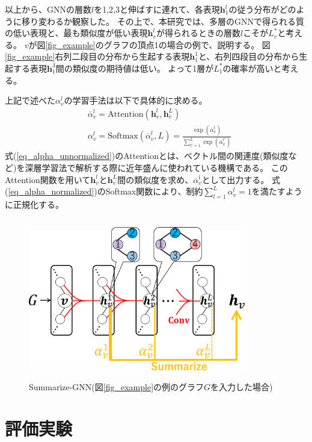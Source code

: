 \documentclass[a4j,twocolumn]{jsarticle}
\begin{document}
以上から、GNNの層数$l$を1,2,3と伸ばすに連れて、各表現$\bm{h}_1^l$の従う分布がどのように移り変わるか観察した。
その上で、本研究では、多層のGNNで得られる質の低い表現と、最も類似度が低い表現$\bm{h}_v^l$が得られるときの層数$l$こそが$L_v^*$と考える。
$v$が図\ref{fig_example}のグラフの頂点1の場合の例で、説明する。
図\ref{fig_example}右列二段目の分布から生起する表現$\bm{h}_1^1$と、右列四段目の分布から生起する表現$\bm{h}_1^3$間の類似度の期待値は低い。
よって1層が$L_1^*$の確率が高いと考える。


上記で述べた$\alpha_v^l$の学習手法は以下で具体的に求める。
\begin{align}
  & \overline{\alpha}_v^l = \text{Attention}(\bm{h}_v^l, \bm{h}_v^L) \label{eq_alpha_unnormalized} \\
  & \alpha_v^l = \text{Softmax}(\overline{\alpha}_v^l, L) = \frac{\exp(\overline{\alpha}_v^l)}{\sum_{l'=1}^L \exp(\overline{\alpha}_v^{l'})} \label{eq_alpha_normalized}
\end{align}
式(\ref{eq_alpha_unnormalized})のAttentionとは、ベクトル間の関連度(類似度など)を深層学習法で解析する際に近年盛んに使われている機構である。
このAttention関数を用いて$\bm{h}_v^l$と$\bm{h}_v^L$間の類似度を求め、$\overline{\alpha}_v^l$として出力する。
式(\ref{eq_alpha_normalized})のSoftmax関数により、制約$\sum_{l=1}^L \alpha_v^l=1$を満たすように正規化する。

\begin{figure}[!h]
  \centering
  \includegraphics[height=7cm,width=9.5cm]{summarize-gnn.pdf}
  \vspace{-6mm}
  \caption{Summarize-GNN(図\ref{fig_example}の例のグラフ$G$を入力した場合)}
  \label{fig_summarize_gnn}
\end{figure}

\section{評価実験}
\label{sec_experiment}
\end{document}

